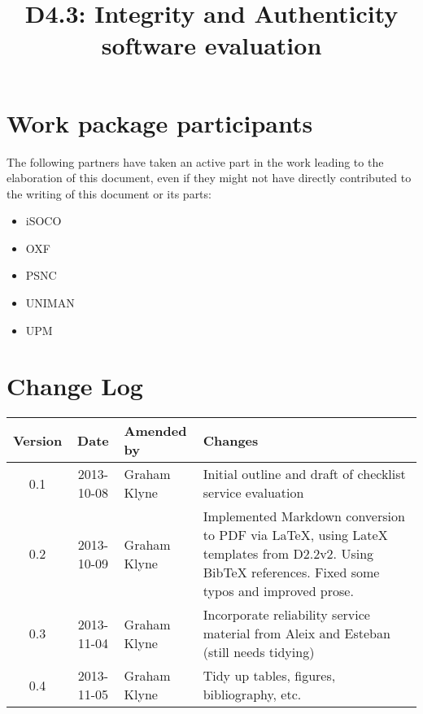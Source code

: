 \documentclass[a4paper, twoside, 11pt]{article}
\title{D4.3: Integrity and Authenticity software evaluation}
\begin{document}
\maketitle

\section*{Work package participants} The following partners have taken an active part in the work leading to the elaboration of this document, even if they might not have directly contributed to the writing of this document or its parts: %
\begin{itemize}
\item iSOCO
\item OXF
\item PSNC
\item UNIMAN
\item UPM
\end{itemize}

\section*{Change Log}
\begin{centering}

\begin{tabular}{|c|c|p{4.92cm}|p{6.5cm}|}

\hline \textbf{Version} & \textbf{Date} & \textbf{Amended by} & \textbf{Changes} \\ \hline
0.1 & 2013-10-08 & Graham Klyne & Initial outline and draft of checklist service evaluation \\ \hline
0.2 & 2013-10-09 & Graham Klyne & Implemented Markdown conversion to PDF via LaTeX, using LateX templates from D2.2v2.  Using BibTeX references.  Fixed some typos and improved prose. \\ \hline
0.3 & 2013-11-04 & Graham Klyne & Incorporate reliability service material from Aleix and Esteban (still needs tidying) \\ \hline
0.4 & 2013-11-05 & Graham Klyne & Tidy up tables, figures, bibliography, etc. \\ \hline


\end{tabular}

\end{centering}
\clearpage
\end{document}
